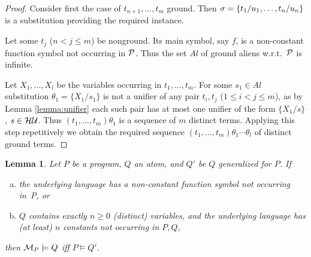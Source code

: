 \documentclass[a4paper]{tlp2}
\newtheorem{lemma}[theorem]{Lemma}
\newcommand*{\seq}[2][n]  {{#2_{1}, \allowbreak \ldots, \allowbreak #2_{#1}}}
\newcommand*{\SEQ}[3]
            {{\ensuremath{#1_{#2}, \allowbreak \ldots, \allowbreak #1_{#3}}}}
\newcommand*{\HU}{{\ensuremath{\cal H U}}\xspace}
\newcommand*{\M}{{\ensuremath{\cal M}}\xspace}
\renewcommand*{\P}{{\ensuremath{\cal P}}\xspace}
\begin{document}
\begin{proof}
Consider first the case of $\SEQ t{n+1}m$ ground.
Then $\sigma=\{t_1/u_1,\ldots,\linebreak[3]t_n/u_n\}$
is a substitution providing the required instance. 
{\sloppy\par}


Let some $t_j$ ($n<j\leq m$) be nonground. 
Its main symbol, say $f$, is a non-constant function symbol not
occurring in $\P$. Thus the set $Al$ of ground aliens w.r.t.\ $\P$ is infinite.
\pagebreak[3]

Let $\seq[l]X$ be the variables occurring in  $\seq[m]t$.
For some $s_1\in Al$ substitution $\theta_1=\{X_1/s_1\}$ is not a unifier of any
pair $t_i,t_j$ ($1\leq i<j\leq m$),
as by  Lemma \ref{lemma:unifier} 
each such pair has at most one unifier of the form $\{X_1/s\}$, $s\in\HU$.
Thus $(\seq[m] t)\theta_1$ is a sequence of $m$ distinct terms.
Applying this step repetitively we obtain the required sequence
$(\seq[m] t)\theta_1\cdots\theta_l$ of distinct ground terms.
\end{proof}





\begin{lemma}
\label{lemma:MP}
Let $P$ be a program,
$Q$ an atom, and  $Q'$ be $Q$ generalized for $P$.
If
\begin{enumerate}[(a)]
\item 
\label{lemma:MP:condition1}
the underlying language has a non-constant function symbol not occurring in~P,
or 

\item 
\label{lemma:MP:condition2}
$Q$ contains exactly $n\geq0$ (distinct) variables, and
the underlying language has (at least) $n$ constants not occurring in $P,Q$,
\nopagebreak
\end{enumerate}
\nopagebreak
then $\M_P\models Q$ iff $P\models Q'$.
\end{lemma}
\end{document}
